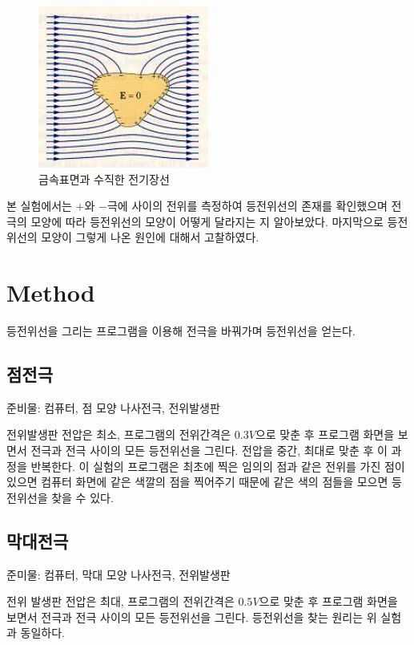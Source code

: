 \documentclass[a4paper]{article}
\begin{document}
		\begin{figure}[htbp]
			\begin{center}
    			\includegraphics[width=0.5\textwidth]{img/dochae.png}
    			\caption{금속표면과 수직한 전기장선} \label{fig:ex2}
			\end{center}
		\end{figure}

	본 실험에서는 $+$와 $-$극에 사이의 전위를 측정하여 등전위선의 존재를 확인했으며 전극의 모양에 따라 등전위선의 모양이 어떻게 달라지는 지 알아보았다. 
	마지막으로 등전위선의 모양이 그렇게 나온 원인에 대해서 고찰하였다.

\section{Method}
	등전위선을 그리는 프로그램을 이용해 전극을 바꿔가며 등전위선을 얻는다.
	\subsection{점전극}
		준비물: 컴퓨터, 점 모양 나사전극, 전위발생판   

		전위발생판 전압은 최소, 프로그램의 전위간격은 $0.3V$으로 맞춘 후 프로그램 화면을 보면서 전극과 전극 사이의 모든 등전위선을 그린다. 
		전압을 중간, 최대로 맞춘 후 이 과정을 반복한다. 
		이 실험의 프로그램은 최초에 찍은 임의의 점과 같은 전위를 가진 점이 있으면 컴퓨터 화면에 같은 색깔의 점을 찍어주기 때문에 같은 색의 점들을 모으면 등전위선을 찾을 수 있다.

	\subsection{막대전극}
		준미물: 컴퓨터, 막대 모양 나사전극, 전위발생판

		전위 발생판 전압은 최대, 프로그램의 전위간격은 $0.5V$으로 맞춘 후 프로그램 화면을 보면서 전극과 전극 사이의 모든 등전위선을 그린다.
		등전위선을 찾는 원리는 위 실험과 동일하다.
\end{document}
